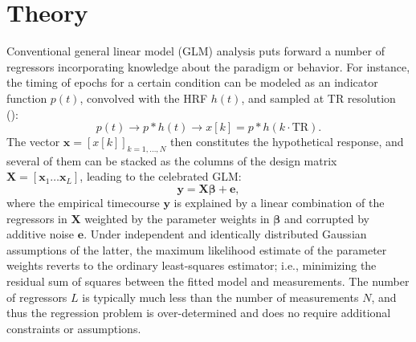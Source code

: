 
\section{Theory}



Conventional general linear model (GLM) analysis puts forward a number of regressors incorporating knowledge about the paradigm or behavior. For instance, the timing of epochs for a certain condition can be modeled as an indicator function $p(t)$, convolved with the HRF $h(t)$, and sampled at TR resolution (\citealt{friston1994analysis, friston1998event, boynton1996linear, cohen1997parametric}):
$$
   p(t) \rightarrow p*h(t) \rightarrow x[k] = p*h(k\cdot\text{TR}).
$$
The vector $\mathbf{x}=[x[k]]_{k=1,\ldots,N}$ then constitutes the hypothetical response, and several of them can be stacked as the columns of the design matrix $\mathbf{X}=[\mathbf{x}_1 \ldots \mathbf{x}_L]$, leading to the celebrated GLM: 
\begin{equation}
    \label{eq:glm}
    \mathbf{y} = \mathbf{X} \boldsymbol\beta + \mathbf{e},
\end{equation}
where the empirical timecourse $\mathbf{y}$ is explained by a linear combination of the regressors in $\mathbf{X}$ weighted by the parameter weights in $\boldsymbol\beta$ and corrupted by additive noise $\mathbf{e}$. Under independent and identically distributed Gaussian assumptions of the latter, the maximum likelihood estimate of the parameter weights reverts to the ordinary least-squares estimator; i.e., minimizing the residual sum of squares between the fitted model and measurements. The number of regressors $L$ is typically much less than the number of measurements $N$, and thus the regression problem is over-determined and does no require additional constraints or assumptions.

